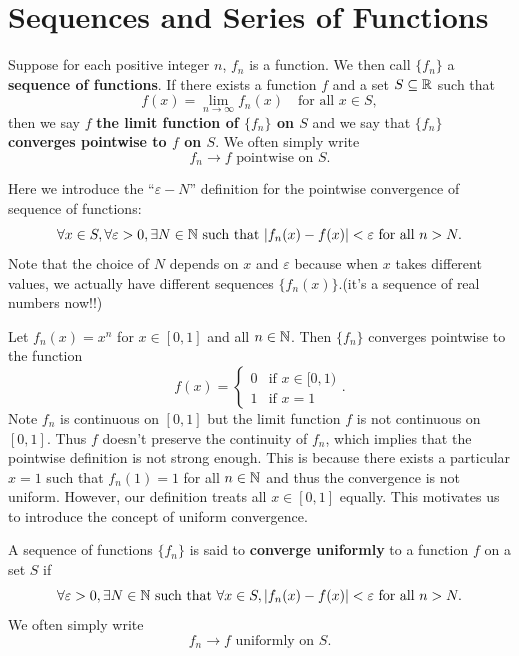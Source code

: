    \section{Sequences and Series of Functions}
    \begin{definitionenv}
        Suppose for each positive integer $n$, $f_n$ is a function. We then call $\{f_n\}$ a \textbf{sequence of functions}. If there exists a function $f$ and a set $S\subseteq \mathbb{R}$ such that
        \[
        f(x) = \lim_{n\to \infty} f_n(x) \quad \text{for all } x\in S,
        \]
        then we say $f$ \textbf{the limit function of $\{f_n\}$ on $S$} and we say that $\{f_n\}$ \textbf{converges pointwise to $f$ on $S$}. We often simply write
        \[
        f_n \to f \text{ pointwise on } S.
        \]
    \end{definitionenv}
    \begin{remarkenv}
        Here we introduce the ``$\varepsilon -N$'' definition for the pointwise convergence of sequence of functions:
        \[
        \forall x\in S, \forall \varepsilon >0, \exists N\in \mathbb{N} \text{ such that } |f_n(x) - f(x)| < \varepsilon \text{ for all } n > N.
        \]
        Note that the choice of $N$ depends on $x$ and $\varepsilon$ because when $x$ takes different values, we actually have different sequences $\{f_n(x)\}$.(it's a sequence of real numbers now!!)
    \end{remarkenv}
    \begin{exampleenv}
        Let $f_n(x) = x^n$ for $x\in [0,1]$ and all $n\in \mathbb{N}$. Then $\{f_n\}$ converges pointwise to the function
        \[
        f(x) = \begin{cases}
        0 & \text{if } x\in [0,1)\\
        1 & \text{if } x=1
        \end{cases}.
        \]
        Note $f_n$ is continuous on $[0,1]$ but the limit function $f$ is not continuous on $[0,1]$. Thus $f$ doesn't preserve the continuity of $f_n$, which implies that the pointwise definition is not strong enough. This is because there exists a particular $x=1$ such that $f_n(1) = 1$ for all $n\in \mathbb{N}$ and thus the convergence is not uniform. However, our definition treats all $x\in [0,1]$ equally. This motivates us to introduce the concept of uniform convergence.
    \end{exampleenv}
    \begin{definitionenv}
        A sequence of functions $\{f_n\}$ is said to \textbf{converge uniformly} to a function $f$ on a set $S$ if
        \[
        \forall \varepsilon >0, \exists N\in \mathbb{N} \text{ such that } \forall x\in S, |f_n(x) - f(x)| < \varepsilon \text{ for all } n > N.
        \]
        We often simply write
        \[
        f_n \to f \text{ uniformly on } S.
        \]
    \end{definitionenv}

